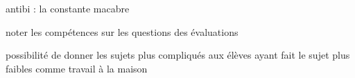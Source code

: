 antibi : la constante macabre







noter les compétences sur les questions des évaluations

possibilité de donner les sujets plus compliqués aux élèves ayant fait le sujet plus faibles comme travail à la maison
